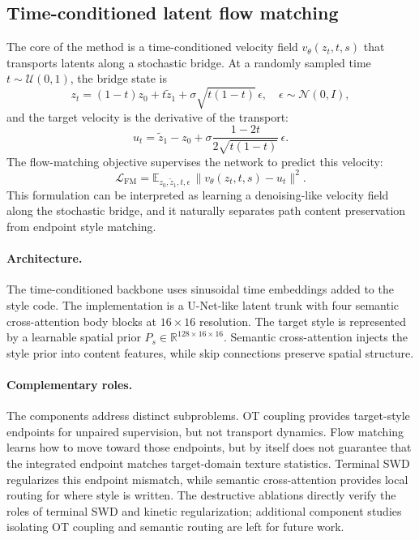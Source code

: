 ﻿\documentclass[letterpaper]{article}
\begin{document}
\subsection{Time-conditioned latent flow matching}
The core of the method is a time-conditioned velocity field $v_\theta(z_t,t,s)$ that transports latents along a stochastic bridge. At a randomly sampled time $t\sim\mathcal{U}(0,1)$, the bridge state is
\begin{equation}
    z_t = (1-t)z_0 + t\tilde{z}_1 + \sigma\sqrt{t(1-t)}\,\epsilon,
    \quad \epsilon\sim\mathcal{N}(0,I),
\end{equation}
and the target velocity is the derivative of the transport:
\begin{equation}
    u_t = \tilde{z}_1 - z_0 + \sigma\frac{1-2t}{2\sqrt{t(1-t)}}\,\epsilon .
\end{equation}
The flow-matching objective supervises the network to predict this velocity:
\begin{equation}
    \mathcal{L}_{\mathrm{FM}} = \mathbb{E}_{z_0,\tilde{z}_1,t,\epsilon}\,
    \bigl\|v_\theta(z_t,t,s) - u_t\bigr\|^2 .
\end{equation}
This formulation can be interpreted as learning a denoising-like velocity field along the stochastic bridge, and it naturally separates path content preservation from endpoint style matching.

\paragraph{Architecture.}
The time-conditioned backbone uses sinusoidal time embeddings added to the style code. The implementation is a U-Net-like latent trunk with four semantic cross-attention body blocks at $16\times16$ resolution. The target style is represented by a learnable spatial prior $P_s\in\mathbb{R}^{128\times16\times16}$. Semantic cross-attention injects the style prior into content features, while skip connections preserve spatial structure.

\paragraph{Complementary roles.}
The components address distinct subproblems. OT coupling provides target-style endpoints for unpaired supervision, but not transport dynamics. Flow matching learns how to move toward those endpoints, but by itself does not guarantee that the integrated endpoint matches target-domain texture statistics. Terminal SWD regularizes this endpoint mismatch, while semantic cross-attention provides local routing for where style is written. The destructive ablations directly verify the roles of terminal SWD and kinetic regularization; additional component studies isolating OT coupling and semantic routing are left for future work.
\end{document}
